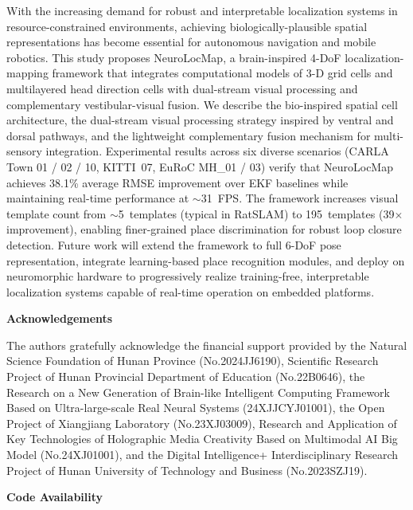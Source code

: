 \documentclass[preprint,12pt]{elsarticle}
\begin{document}
With the increasing demand for robust and interpretable localization systems in resource-constrained environments, achieving biologically-plausible spatial representations has become essential for autonomous navigation and mobile robotics. This study proposes NeuroLocMap, a brain-inspired 4-DoF localization-mapping framework that integrates computational models of 3-D grid cells and multilayered head direction cells with dual-stream visual processing and complementary vestibular-visual fusion. We describe the bio-inspired spatial cell architecture, the dual-stream visual processing strategy inspired by ventral and dorsal pathways, and the lightweight complementary fusion mechanism for multi-sensory integration. Experimental results across six diverse scenarios (CARLA Town 01 / 02 / 10, KITTI~07, EuRoC MH\_01 / 03) verify that NeuroLocMap achieves 38.1\% average RMSE improvement over EKF baselines while maintaining real-time performance at $\sim$31~FPS. The framework increases visual template count from $\sim$5~templates (typical in RatSLAM) to 195~templates (39$\times$ improvement), enabling finer-grained place discrimination for robust loop closure detection. Future work will extend the framework to full 6-DoF pose representation, integrate learning-based place recognition modules, and deploy on neuromorphic hardware to progressively realize training-free, interpretable localization systems capable of real-time operation on embedded platforms.

\vspace{2em}

\noindent \textbf{Acknowledgements}
\vspace{1em}

The authors gratefully acknowledge the financial support provided by the Natural Science Foundation of Hunan Province (No.2024JJ6190), Scientific Research Project of Hunan Provincial Department of Education (No.22B0646), the Research on a New Generation of Brain-like Intelligent Computing Framework Based on Ultra-large-scale Real Neural Systems (24XJJCYJ01001), the Open Project of Xiangjiang Laboratory (No.23XJ03009), Research and Application of Key Technologies of Holographic Media Creativity Based on Multimodal AI Big Model (No.24XJ01001), and the Digital Intelligence+ Interdisciplinary Research Project of Hunan University of Technology and Business (No.2023SZJ19).

\vspace{1em}
\noindent \textbf{Code Availability}
\vspace{0.5em}
\end{document}
